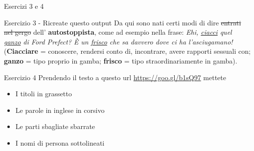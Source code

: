 \begin{frame}{Esercizi 3 e 4}

\begin{block}{Esercizio 3 - Ricreate questo output}
Da qui sono nati certi modi di dire \sout{entrati nel gergo} dell'
\textbf{autostoppista}, come ad esempio nella frase: \textit{Ehi, 
\underline{ciacci} quel \underline{ganzo} di Ford Prefect? È un
\underline{frisco} che sa davvero dove ci ha l’asciugamano!} (\textbf{Ciacciare}
 = conoscere, rendersi conto di, incontrare, avere rapporti sessuali con; 
\textbf{ganzo} = tipo proprio in gamba; \textbf{frisco} = tipo
straordinariamente in gamba).
\end{block}

\begin{block}{Esercizio 4}
	Prendendo il testo a questo url \url{https://goo.gl/b1sQ97} mettete
	\begin{itemize}
	\item I titoli in grassetto
	\item Le parole in inglese in corsivo
	\item Le parti sbagliate sbarrate
	\item I nomi di persona sottolineati
	\end{itemize}
\end{block}

\end{frame}